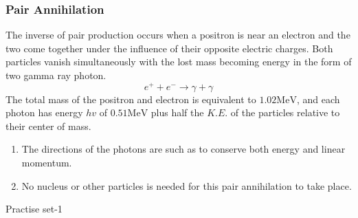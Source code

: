 \subsubsection{Pair Annihilation}
The inverse of pair production occurs when a positron is near an electron and the two come together under the influence of their opposite electric charges. Both particles vanish simultaneously with the lost mass becoming energy in the form of two gamma ray photon.
$$
e^{+}+e^{-} \rightarrow \gamma+\gamma
$$
The total mass of the positron and electron is equivalent to $1.02 \mathrm{MeV}$, and each photon has energy $h v$ of $0.51 \mathrm{MeV}$ plus half the $K . E$. of the particles relative to their center of mass.
\begin{note}
	\begin{enumerate}
		\item The directions of the photons are such as to conserve both energy and linear momentum.
		\item No nucleus or other particles is needed for this pair annihilation to take place.
	\end{enumerate}
\end{note}
\newpage
\begin{abox}
	Practise set-1
\end{abox}
